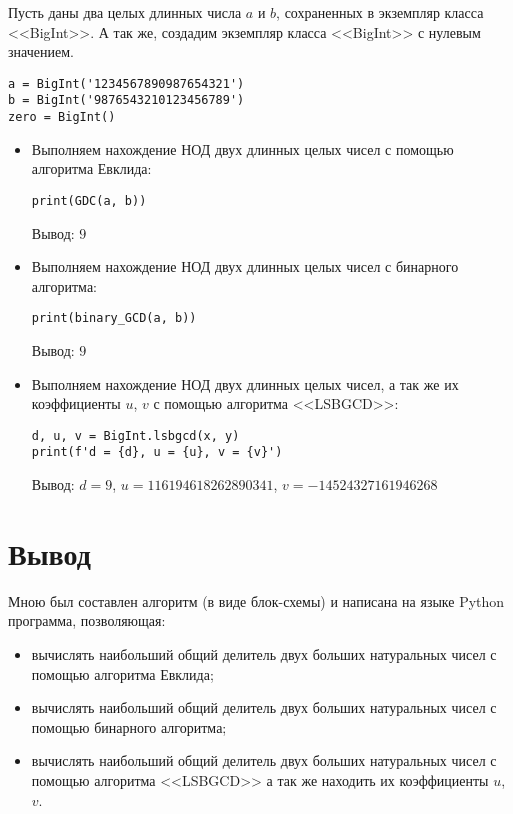 Пусть даны два целых длинных числа $a$ и $b$, сохраненных в экземпляр класса <<BigInt>>.
А так же, создадим экземпляр класса <<BigInt>> с нулевым значением.
    \begin{lstlisting}
a = BigInt('1234567890987654321')
b = BigInt('9876543210123456789')
zero = BigInt()\end{lstlisting}

    \begin{itemize}
        \item Выполняем нахождение НОД двух длинных целых чисел с помощью алгоритма Евклида:
        \begin{lstlisting}
print(GDC(a, b))\end{lstlisting}
        Вывод: $9$
        \item Выполняем нахождение НОД двух длинных целых чисел с бинарного алгоритма:
        \begin{lstlisting}
print(binary_GCD(a, b))\end{lstlisting}
        Вывод: $9$
        \item Выполняем нахождение НОД двух длинных целых чисел, а так же их коэффициенты $u$, $v$ с помощью алгоритма <<LSBGCD>>:
        \begin{lstlisting}
d, u, v = BigInt.lsbgcd(x, y)
print(f'd = {d}, u = {u}, v = {v}')\end{lstlisting}
        Вывод: $d = 9$, $u = 116194618262890341$, $v = -14524327161946268$
    \end{itemize}

\clearpage
\section{Вывод}
Мною был составлен алгоритм (в виде блок-схемы) и написана на языке Python программа, позволяющая:
\begin{itemize}
    \item вычислять наибольший общий делитель двух больших натуральных чисел с помощью алгоритма Евклида;
    \item вычислять наибольший общий делитель двух больших натуральных чисел с помощью бинарного алгоритма;
    \item вычислять наибольший общий делитель двух больших натуральных чисел с помощью алгоритма <<LSBGCD>>
    а так же находить их коэффициенты $u$, $v$.
\end{itemize}

\clearpage
